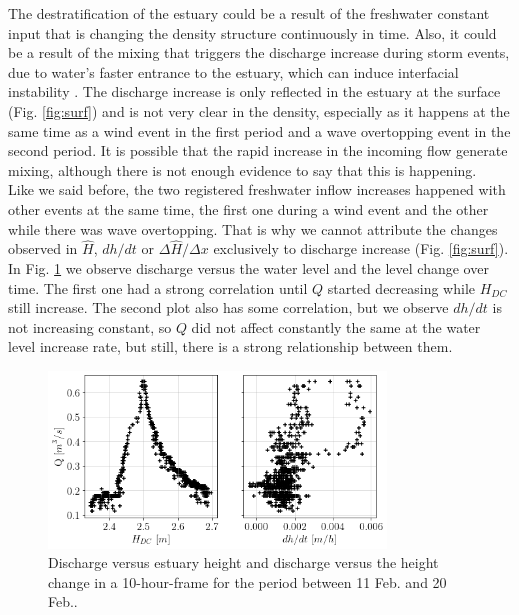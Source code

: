 \documentclass[tesis.tex]{subfiles}
\begin{document}
The destratification of the estuary could be a result of the freshwater constant input that is changing the density structure continuously in time. Also, it could be a result of the mixing that triggers the discharge increase during storm events, due to water's faster entrance to the estuary, which can induce interfacial instability \citep{Katopodes2018}. The discharge increase is only reflected in the estuary at the surface (Fig. \ref{fig:surf}) and is not very clear in the density, especially as it happens at the same time as a wind event in the first period and a wave overtopping event in the second period. It is possible that the rapid increase in the incoming flow generate mixing, although there is not enough evidence to say that this is happening.\\

Like we said before, the two registered freshwater inflow increases happened with other events at the same time, the first one during a wind event and the other while there was wave overtopping. That is why we cannot attribute the changes observed in $\hat{H}$, $dh/dt$ or $\Delta \hat{H}/\Delta x$ exclusively to discharge increase (Fig. \ref{fig:surf}). In Fig. \ref{fig:qh} we observe discharge versus the water level and the level change over time. The first one had a strong correlation until $Q$ started decreasing while $H_{DC}$ still increase. The second plot also has some correlation, but we observe $dh/dt$ is not increasing constant, so $Q$ did not affect constantly the same at the water level increase rate, but still, there is a strong relationship between them.\\

\begin{figure}[h!]
    \centering
    \includegraphics[width=0.8\textwidth]{Imagenes/qh.png}
    \caption{Discharge versus estuary height and discharge versus the height change in a 10-hour-frame for the period between 11 Feb. and 20 Feb..}
    \label{fig:qh}
\end{figure}
\end{document}
